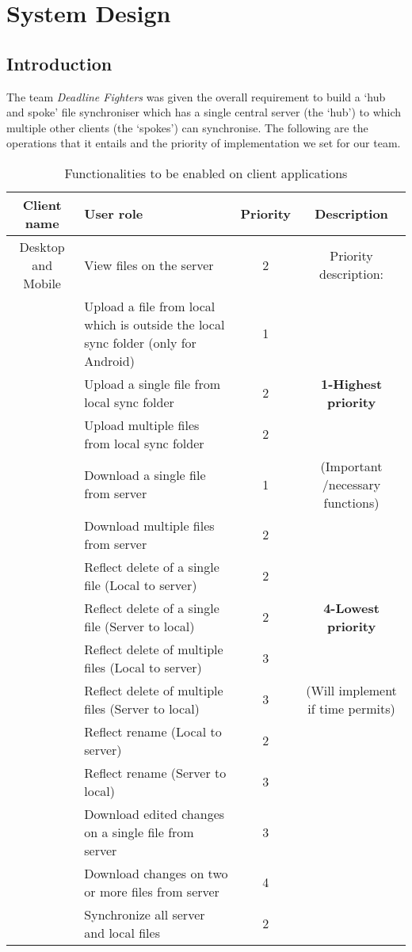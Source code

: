 \section{System Design}
\subsection{Introduction}
The team \emph{Deadline Fighters} was given the overall requirement to build a ‘hub and spoke’ file synchroniser which has a single central server (the ‘hub’) to which multiple other clients (the ‘spokes’) can synchronise. The following are the operations that it entails and the priority of implementation we set for our team.

\bgroup
\def\arraystretch{1.3}
\begin{table}[H]
\centering
\begin{tabular}{|c|m{8cm}|c|c|}
\hline
Client name & User role & Priority & Description\\
\hline
{Desktop and Mobile} & View files on the server & 2 &{Priority description:} \\
\cline{2-3}
& Upload a file from local which is outside the local sync folder (only for Android)& 1&{}  \\
\cline{2-3}
& Upload a single file from local sync folder & 2&{\textbf{1-Highest priority}}\\
\cline{2-3}
& Upload multiple files from local sync folder & 2&{}\\
\cline{2-3}
&Download a single file from server & 1 &{(Important /necessary functions)}\\
\cline{2-3}
&Download multiple files from server & 2&{}\\
\cline{2-3}
&Reflect delete of a single file (Local to server) & 2&{}\\
\cline{2-3}
&Reflect delete of a single file (Server to local) & 2&{\textbf{4-Lowest priority}}\\
\cline{2-3}
&Reflect delete of multiple files (Local to server) & 3 &{}\\
\cline{2-3}
&Reflect delete of multiple files (Server to local) & 3&{(Will implement if time permits)}\\
\cline{2-3}
&Reflect rename (Local to server) & 2&{}\\
\cline{2-3}
&Reflect rename (Server to local) & 3&{}\\
\cline{2-3}
&Download edited changes on a single file from server & 3&{}\\
\cline{2-3}
&Download changes on two or more files from server & 4&{}\\
\cline{2-3}
&Synchronize all server and local files & 2&{}\\
\hline
\bottomrule
\end{tabular}
\caption{Functionalities to be enabled on client applications}
\end{table}
\egroup


